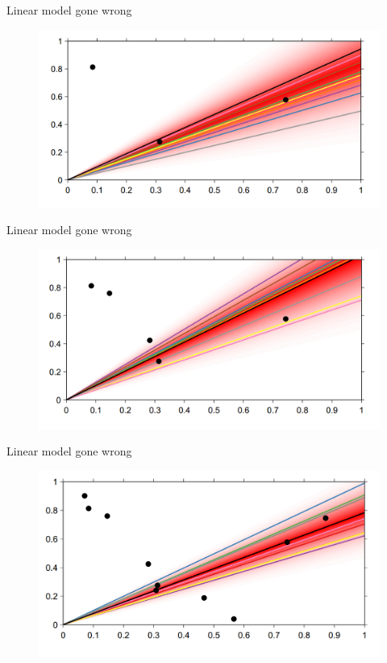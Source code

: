 \documentclass[12pt]{beamer}
\begin{document}
\begin{frame}{Linear model gone wrong}
\begin{figure}
\includegraphics[scale=0.4]{Bayesian_non_linear_11.png} 
\end{figure}
\end{frame}
\begin{frame}{Linear model gone wrong}
\begin{figure}
\includegraphics[scale=0.4]{Bayesian_non_linear_12.png} 
\end{figure}
\end{frame}
\begin{frame}{Linear model gone wrong}
\begin{figure}
\includegraphics[scale=0.4]{Bayesian_non_linear_13.png} 
\end{figure}
\end{frame}
\end{document}
